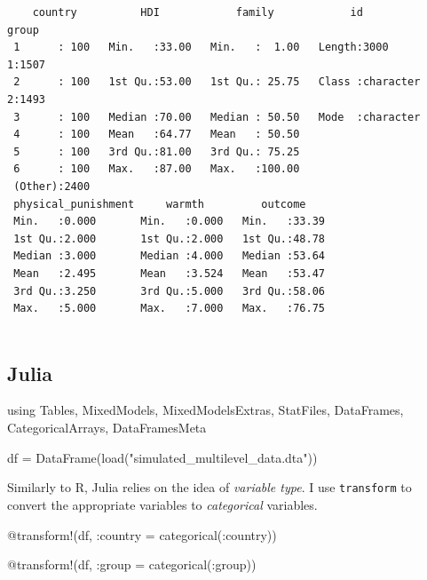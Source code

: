 \documentclass[
  letterpaper,
  DIV=11,
  numbers=noendperiod]{scrreprt}
\newenvironment{Shaded}{\begin{snugshade}}{\end{snugshade}}
\newcommand{\BuiltInTok}[1]{\textcolor[rgb]{0.00,0.23,0.31}{#1}}
\newcommand{\FunctionTok}[1]{\textcolor[rgb]{0.28,0.35,0.67}{#1}}
\newcommand{\ImportTok}[1]{\textcolor[rgb]{0.00,0.46,0.62}{#1}}
\newcommand{\NormalTok}[1]{\textcolor[rgb]{0.00,0.23,0.31}{#1}}
\newcommand{\OperatorTok}[1]{\textcolor[rgb]{0.37,0.37,0.37}{#1}}
\newcommand{\PreprocessorTok}[1]{\textcolor[rgb]{0.68,0.00,0.00}{#1}}
\newcommand{\StringTok}[1]{\textcolor[rgb]{0.13,0.47,0.30}{#1}}
\begin{document}
\begin{verbatim}
    country          HDI            family            id            group   
 1      : 100   Min.   :33.00   Min.   :  1.00   Length:3000        1:1507  
 2      : 100   1st Qu.:53.00   1st Qu.: 25.75   Class :character   2:1493  
 3      : 100   Median :70.00   Median : 50.50   Mode  :character           
 4      : 100   Mean   :64.77   Mean   : 50.50                              
 5      : 100   3rd Qu.:81.00   3rd Qu.: 75.25                              
 6      : 100   Max.   :87.00   Max.   :100.00                              
 (Other):2400                                                               
 physical_punishment     warmth         outcome     
 Min.   :0.000       Min.   :0.000   Min.   :33.39  
 1st Qu.:2.000       1st Qu.:2.000   1st Qu.:48.78  
 Median :3.000       Median :4.000   Median :53.64  
 Mean   :2.495       Mean   :3.524   Mean   :53.47  
 3rd Qu.:3.250       3rd Qu.:5.000   3rd Qu.:58.06  
 Max.   :5.000       Max.   :7.000   Max.   :76.75  
                                                    
\end{verbatim}

\subsection{Julia}

\begin{Shaded}
\begin{Highlighting}[]
\ImportTok{using} \BuiltInTok{Tables}\NormalTok{, }\BuiltInTok{MixedModels}\NormalTok{, }\BuiltInTok{MixedModelsExtras}\NormalTok{, }\BuiltInTok{StatFiles}\NormalTok{, }\BuiltInTok{DataFrames}\NormalTok{, }\BuiltInTok{CategoricalArrays}\NormalTok{, }\BuiltInTok{DataFramesMeta}

\NormalTok{df }\OperatorTok{=} \FunctionTok{DataFrame}\NormalTok{(}\FunctionTok{load}\NormalTok{(}\StringTok{"simulated\_multilevel\_data.dta"}\NormalTok{))}
\end{Highlighting}
\end{Shaded}

Similarly to R, Julia relies on the idea of \emph{variable type}. I use
\texttt{transform} to convert the appropriate variables to
\emph{categorical} variables.

\begin{Shaded}
\begin{Highlighting}[]
\PreprocessorTok{@transform}\NormalTok{!(df, }\OperatorTok{:}\NormalTok{country }\OperatorTok{=} \FunctionTok{categorical}\NormalTok{(}\OperatorTok{:}\NormalTok{country))}

\PreprocessorTok{@transform}\NormalTok{!(df, }\OperatorTok{:}\NormalTok{group }\OperatorTok{=} \FunctionTok{categorical}\NormalTok{(}\OperatorTok{:}\NormalTok{group))}
\end{Highlighting}
\end{Shaded}
\end{document}

